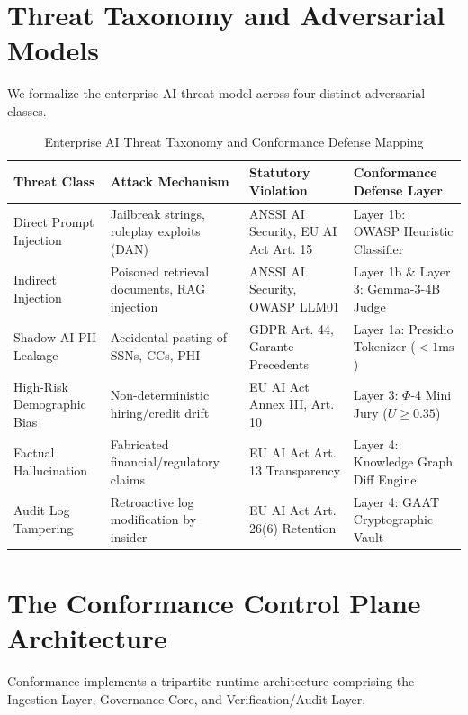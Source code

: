 \documentclass[11pt,a4paper]{article}
\theoremstyle{definition}
\begin{document}
\section{Threat Taxonomy and Adversarial Models}
\label{sec:threat_model}

We formalize the enterprise AI threat model across four distinct adversarial classes.

\begin{table}[t]
\caption{Enterprise AI Threat Taxonomy and Conformance Defense Mapping}
\label{tab:threat_taxonomy}
\centering
\begin{tabular}{@{}llll@{}}
\toprule
\textbf{Threat Class} & \textbf{Attack Mechanism} & \textbf{Statutory Violation} & \textbf{Conformance Defense Layer} \\ \midrule
Direct Prompt Injection & Jailbreak strings, roleplay exploits (DAN) & ANSSI AI Security, EU AI Act Art. 15 & Layer 1b: OWASP Heuristic Classifier \\
Indirect Injection & Poisoned retrieval documents, RAG injection & ANSSI AI Security, OWASP LLM01 & Layer 1b \& Layer 3: Gemma-3-4B Judge \\
Shadow AI PII Leakage & Accidental pasting of SSNs, CCs, PHI & GDPR Art. 44, Garante Precedents & Layer 1a: Presidio Tokenizer ($<1\text{ms}$) \\
High-Risk Demographic Bias & Non-deterministic hiring/credit drift & EU AI Act Annex III, Art. 10 & Layer 3: $\Phi$-4 Mini Jury ($U \ge 0.35$) \\
Factual Hallucination & Fabricated financial/regulatory claims & EU AI Act Art. 13 Transparency & Layer 4: Knowledge Graph Diff Engine \\
Audit Log Tampering & Retroactive log modification by insider & EU AI Act Art. 26(6) Retention & Layer 4: GAAT Cryptographic Vault \\ \bottomrule
\end{tabular}
\end{table}


\section{The Conformance Control Plane Architecture}
\label{sec:arch_deep_dive}

Conformance implements a tripartite runtime architecture comprising the Ingestion Layer, Governance Core, and Verification/Audit Layer.
\end{document}
